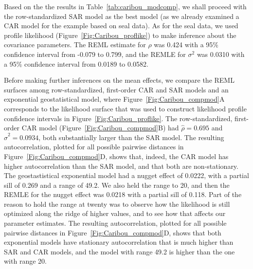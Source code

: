 \documentclass[12pt, titlepage]{article}
\begin{document}
Based on the the results in Table~\ref{tab:caribou_modcomp}, we shall proceed with the row-standardized SAR model as the best model (as we already examined a CAR model for the example based on seal data).  As for the seal data, we used profile likelihood (Figure~\ref{Fig:Caribou_proflike}) to make inference about the covariance parameters. The REML estimate for $\rho$ was 0.424 with a 95\% confidence interval from -0.079 to 0.799, and the REMLE for $\sigma^{2}$ was 0.0310 with a 95\% confidence interval from 0.0189 to 0.0582.



Before making further inferences on the mean effects, we compare the REML surfaces among row-standardized, first-order CAR and SAR models and an exponential geostatistical model, where Figure~\ref{Fig:Caribou_compmod}A corresponds to the likelihood surface that was used to construct likelihood profile confidence intervals in Figure~\ref{Fig:Caribou_proflike}.  The row-standardized, first-order CAR model (Figure~\ref{Fig:Caribou_compmod}B) had $\hat{\rho} = 0.695$ and $\hat{\sigma}^{2} = 0.0934$, both substantially larger than the SAR model.  The resulting autocorrelation, plotted for all possible pairwise distances in Figure~\ref{Fig:Caribou_compmod}D, shows that, indeed, the CAR model has higher autocorrelation than the SAR model, and that both are non-stationary.  The geostastistical exponential model had a nugget effect of 0.0222, with a partial sill of 0.269 and a range of 49.2. We also held the range to 20, and then the REMLE for the nugget effect was 0.0218 with a partial sill of 0.118.  Part of the reason to hold the range at twenty was to observe how the likelihood is still optimized along the ridge of higher values, and to see how that affects our parameter estimates.  The resulting autocorrelation, plotted for all possible pairwise distances in Figure~\ref{Fig:Caribou_compmod}D, shows that both exponential models have stationary autocorrelation that is much higher than SAR and CAR models, and the model with range 49.2 is higher than the one with range 20.
\end{document}

